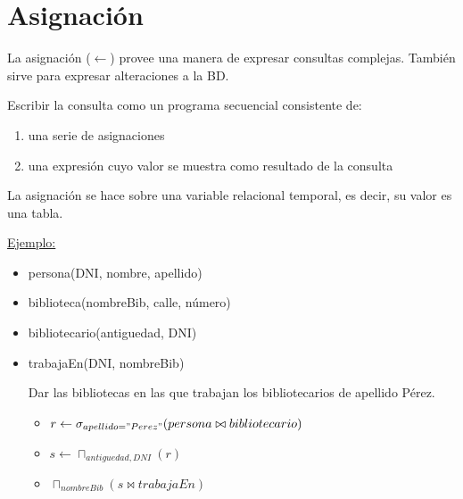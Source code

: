 \documentclass[12pt,a4paper]{report}
\begin{document}
	\section{Asignación}
		\par La asignación ($\leftarrow$) provee una manera de expresar consultas complejas. También sirve para expresar alteraciones a la BD.
		\vspace{5mm}
		\par Escribir la consulta como un programa secuencial consistente de:
		\begin{enumerate}
			\item una serie de asignaciones
			\item una expresión cuyo valor se muestra como resultado de la consulta
		\end{enumerate}
		\par La asignación se hace sobre una variable relacional temporal, es decir, su valor es una tabla.
		
		\par \underline{Ejemplo:}
		\begin{itemize}
			\item persona(DNI, nombre, apellido)
			\item biblioteca(nombreBib, calle, número)
			\item bibliotecario(antiguedad, DNI)
			\item trabajaEn(DNI, nombreBib)
			\par Dar las bibliotecas en las que trabajan los bibliotecarios de apellido Pérez.
			\begin{itemize}
				\item $r \leftarrow \sigma_{apellido="Perez"} (persona \bowtie bibliotecario)$
				\item $s \leftarrow \sqcap_{antiguedad, DNI} (r)$
				\item $ \sqcap_{nombreBib} (s \bowtie trabajaEn)$
			\end{itemize}
		\end{itemize}
		
\end{document}
